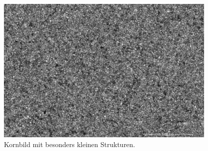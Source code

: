 \documentclass[
  12pt,
  openany]{book}
\begin{document}
\begin{figure}

{\centering \includegraphics[width=0.96\textwidth]{../imgs/michel} 

}

\caption[Kornbild mit besonders kleinen Strukturen.]{Kornbild mit besonders kleinen Strukturen.}\label{fig:michelGrains}
\end{figure}
\end{document}

